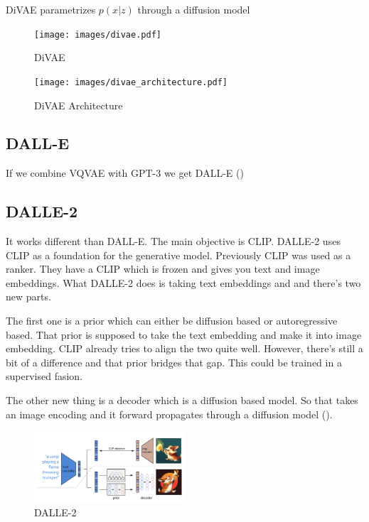DiVAE parametrizes $p(x|z)$ through a diffusion model
\begin{figure}[h!]
    \centering
    \texttt{[image: images/divae.pdf]}
    \caption{DiVAE}
    \label{fig:divae}
\end{figure}

\begin{figure}[h!]
    \centering
    \texttt{[image: images/divae\_architecture.pdf]}
    \caption{DiVAE Architecture}
    \label{fig:divae_architecture}
\end{figure}


\subsection{DALL-E}
If we combine VQVAE with GPT-3 we get DALL-E (\cite{ramesh2021zeroshot})

\subsection{DALLE-2}
It works different than DALL-E. The main objective is CLIP.
DALLE-2 uses CLIP as a foundation for the generative model.
Previously CLIP was used as a ranker. They have a CLIP which is frozen and gives you text and image embeddings.
What DALLE-2 does is taking text embeddings and and there's two new parts.

The first one is a prior which can either be diffusion based or autoregressive based.
That prior is supposed to take the text embedding and make it into image embedding.
CLIP already tries to align the two quite well.
However, there's still a bit of a difference and that prior bridges that gap.
This could be trained in a supervised fasion.

The other new thing is a decoder which is a diffusion based model.
So that takes an image encoding and it forward propagates through a diffusion model (\cite{ramesh2022}).

\begin{figure}[h!]
    \centering
    \includegraphics[width=0.5\textwidth]{images/dalle2.png}
    \caption{DALLE-2}
    \label{fig:dalle2}
\end{figure}

